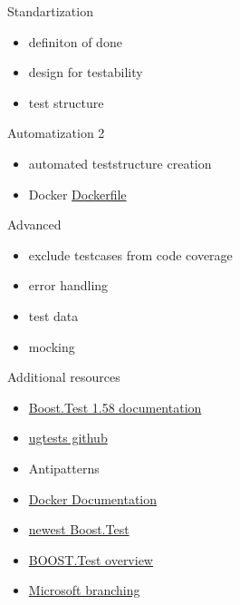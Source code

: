 \documentclass{beamer}
\begin{document}
    \begin{frame}{Standartization}
        \begin{itemize}
            \item definiton of done
            \item design for testability
            \item test structure
        \end{itemize}
    \end{frame}

    \begin{frame}{Automatization 2}
        \begin{itemize}
            \item automated teststructure creation 
            \item Docker \href{https://github.com/Tobias-Trautmann/docker4ug4}{Dockerfile}
        \end{itemize}
    \end{frame}

    \begin{frame}{Advanced}
        \begin{itemize}
            \item exclude testcases from code coverage
            \item error handling
            \item test data%
            \item mocking
        \end{itemize}
    \end{frame}
    
    \begin{frame}{Additional resources}
            \begin{itemize}
                \item \href{https://www.boost.org/doc/libs/1_58_0/libs/test/}{Boost.Test 1.58 documentation}
                \item \href{https://github.com/UG4/plugin_UGTest}{ugtests github}
                \item Antipatterns
                \item \href{https://docs.docker.com/}{Docker Documentation}
                \item \href{https://www.boost.org/doc/libs/1_73_0/libs/test/}{newest Boost.Test} %
                \item \href{https://www.boost.org/doc/libs/1_73_0/libs/test/doc/html/boost_test/testing_tools/summary.html}{BOOST.Test overview}
                \item \href{https://docs.microsoft.com/en-us/azure/devops/repos/git/git-branching-guidance?view=azure-devops}{Microsoft branching}
            \end{itemize}
    \end{frame}
\end{document}
